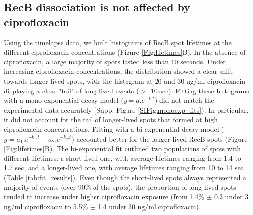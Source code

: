 \subsection*{RecB dissociation is not affected by ciprofloxacin}

Using the timelapse data, we built histograms of RecB spot lifetimes at the different ciprofloxacin concentrations (Figure \ref{Fig:lifetimes}B). In the absence of ciprofloxacin, a large majority of spots lasted less than 10 seconds. Under increasing ciprofloxacin concentrations, the distribution showed a clear shift towards longer-lived spots, with the histogram at 20 and 30 ng/ml ciprofloxacin displaying a clear "tail" of long-lived events ($>$ 10 sec). Fitting these histograms with a mono-exponential decay model ($y = a.e^{-k.t}$) did not match the experimental data accurately (Supp. Figure \ref{SIFig:monoexp_fits}). In particular, it did not account for the tail of longer-lived spots that formed at high ciprofloxacin concentrations. Fitting with a bi-exponential decay model ($y = a_1.e^{-k_1.t} + a_2.e^{-k_2.t}$) accounted better for the longer-lived RecB spots (Figure \ref{Fig:lifetimes}B). The bi-exponential fit outlined two populations of spots with different lifetimes: a short-lived one, with average lifetimes ranging from 1.4 to 1.7 sec, and a longer-lived one, with average lifetimes ranging from 10 to 14 sec (Table \ref{tab:fit_results}). Even though the short-lived spots always represented a majority of events (over 90\% of the spots), the proportion of long-lived spots tended to increase under higher ciprofloxacin exposure (from 1.4\% $\pm$ 0.3 under 3 ng/ml ciprofloxacin to 5.5\% $\pm$ 1.4 under 30 ng/ml ciprofloxacin).

